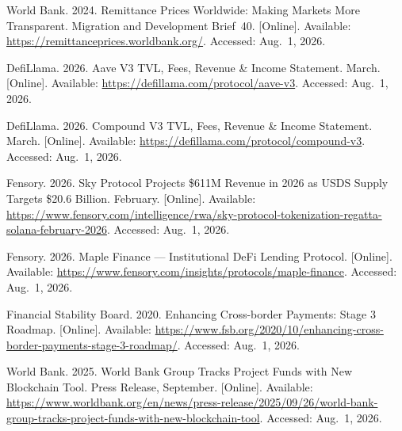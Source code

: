 {\begin{enumerate}[label={[\arabic*]}]
\item World Bank. 2024. Remittance Prices Worldwide: Making Markets More Transparent. Migration and Development Brief~40. [Online]. Available: \url{https://remittanceprices.worldbank.org/}. Accessed: Aug.~1, 2026.

\item DefiLlama. 2026. Aave V3 TVL, Fees, Revenue \& Income Statement. March. [Online]. Available: \url{https://defillama.com/protocol/aave-v3}. Accessed: Aug.~1, 2026.

\item DefiLlama. 2026. Compound V3 TVL, Fees, Revenue \& Income Statement. March. [Online]. Available: \url{https://defillama.com/protocol/compound-v3}. Accessed: Aug.~1, 2026.

\item Fensory. 2026. Sky Protocol Projects \$611M Revenue in 2026 as USDS Supply Targets \$20.6 Billion. February. [Online]. Available: \url{https://www.fensory.com/intelligence/rwa/sky-protocol-tokenization-regatta-solana-february-2026}. Accessed: Aug.~1, 2026.

\item Fensory. 2026. Maple Finance --- Institutional DeFi Lending Protocol. [Online]. Available: \url{https://www.fensory.com/insights/protocols/maple-finance}. Accessed: Aug.~1, 2026.


\item Financial Stability Board. 2020. Enhancing Cross-border Payments: Stage 3 Roadmap. [Online]. Available: \url{https://www.fsb.org/2020/10/enhancing-cross-border-payments-stage-3-roadmap/}. Accessed: Aug.~1, 2026.


\item World Bank. 2025. World Bank Group Tracks Project Funds with New Blockchain Tool. Press Release, September. [Online]. Available: \url{https://www.worldbank.org/en/news/press-release/2025/09/26/world-bank-group-tracks-project-funds-with-new-blockchain-tool}. Accessed: Aug.~1, 2026.


\end{enumerate}}
